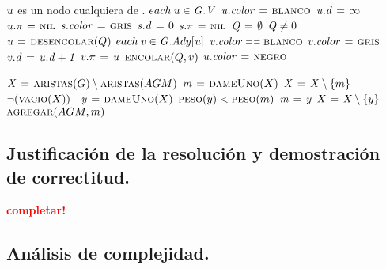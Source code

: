 \begin{codebox}
\li \Comment $\id{u}$ es un nodo cualquiera de .
\li \For $each \hspace{0.07cm} \id{u} \in \id{G.V}$
\li     \Do
            $\id{u.color} \gets \const{blanco}$
\li         $\id{u.d} \gets \infty$
\li         $\id{u.\pi} \gets \const{nil}$
        \End
\li $\id{s.color} \gets \const{gris}$
\li $\id{s.d} \gets 0$
\li $\id{s.\pi} \gets \const{nil}$
\li $\id{Q} \gets \emptyset$
\li \While $\id{Q} \neq 0$
\li     \Do
            $\id{u} \gets \proc{desencolar}(Q)$
\li         \For $each \hspace{0.07cm} \id{v} \in \id{G.Ady[u]}$
                \Do
\li                 \If $\id{v.color} \isequal \const{blanco}$
\li                     \Then
                            $\id{v.color} \gets \const{gris}$
\li                         $\id{v.d} \gets \id{u.d + 1}$
\li                         $\id{v.\pi} \gets \id{u}$
\li                         $\textnormal{\scshape encolar}(Q,v)$
                        \End
                \End
\li     $\id{u.color} \gets \const{negro}$
        \End
\end{codebox}


\vspace*{0.3cm}


\begin{codebox}
\li $\id{X} \gets \proc{aristas}(G) \setminus \proc{aristas}(AGM)$
\li $\id{m} \gets \proc{dameUno}(X)$
\li $\id{X} \gets \id{X} \setminus \{m\}$
\li \While $\neg (\textnormal{\scshape vacio}(X))$
\li     \Do
\           $\id{y} \gets \proc{dameUno}(X)$
\li         \If $\textnormal{\scshape peso}(y) < \textnormal{\scshape peso}(m)$
\li             \Then
                    $\id{m} \gets \id{y}$
                \End
\li         $\id{X} \gets \id{X} \setminus \{y\}$
        \End
\li \Return $\textnormal{\scshape agregar}(AGM, m)$
\end{codebox}



\newpage
\subsection{Justificación de la resolución y demostración de correctitud.}

\vspace*{0.3cm}

\textcolor{red}{\textbf{completar!}}



\newpage
\subsection{Análisis de complejidad.}


